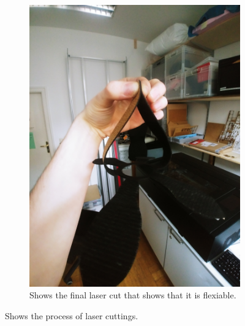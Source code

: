 \documentclass[04.3_buildingProcess.tex]{subfiles}
\begin{document}
\begin{figure}[H]
\begin{subfigure}{.45\textwidth}
            \includegraphics[width=0.6\linewidth, angle=270]{images/materialProcess/08_LaserCut.jpg}
            \caption{Shows the final laser cut that shows that it is flexiable.}
            \label{fig:08_LaserCut}
            \vspace{6mm}
        \end{subfigure}
        \caption{Shows the process of laser cuttings.}
        \label{fig:laserCutTests}
    \end{figure}
\end{document}
